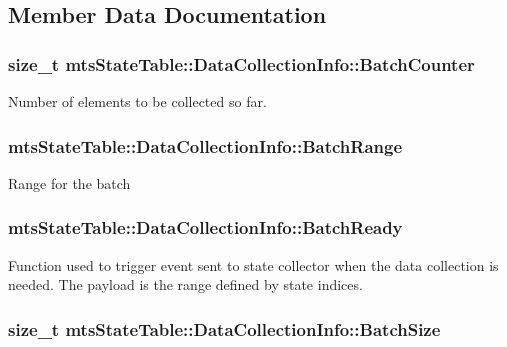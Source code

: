 \subsection{Member Data Documentation}
\hypertarget{classmts_state_table_1_1_data_collection_info_a30686d9c50ff6a42cff2160fec55255e}{
\subsubsection[{Batch\-Counter}]{\setlength{\rightskip}{0pt plus 5cm}size\-\_\-t mts\-State\-Table\-::\-Data\-Collection\-Info\-::\-Batch\-Counter}}\label{classmts_state_table_1_1_data_collection_info_a30686d9c50ff6a42cff2160fec55255e}
Number of elements to be collected so far. \hypertarget{classmts_state_table_1_1_data_collection_info_aa0343b1641a1f2d77a8b3e4bfb79b17b}{
\subsubsection[{Batch\-Range}]{ mts\-State\-Table\-::\-Data\-Collection\-Info\-::\-Batch\-Range}}\label{classmts_state_table_1_1_data_collection_info_aa0343b1641a1f2d77a8b3e4bfb79b17b}
Range for the batch \hypertarget{classmts_state_table_1_1_data_collection_info_a1e655dfe05376806b0b8af648ded69e9}{
\subsubsection[{Batch\-Ready}]{ mts\-State\-Table\-::\-Data\-Collection\-Info\-::\-Batch\-Ready}}\label{classmts_state_table_1_1_data_collection_info_a1e655dfe05376806b0b8af648ded69e9}
Function used to trigger event sent to state collector when the data collection is needed. The payload is the range defined by state indices. \hypertarget{classmts_state_table_1_1_data_collection_info_ac99fb26fa253839f3e56bb5102f50ed4}{
\subsubsection[{Batch\-Size}]{\setlength{\rightskip}{0pt plus 5cm}size\-\_\-t mts\-State\-Table\-::\-Data\-Collection\-Info\-::\-Batch\-Size}}\label{classmts_state_table_1_1_data_collection_info_ac99fb26fa253839f3e56bb5102f50ed4}
